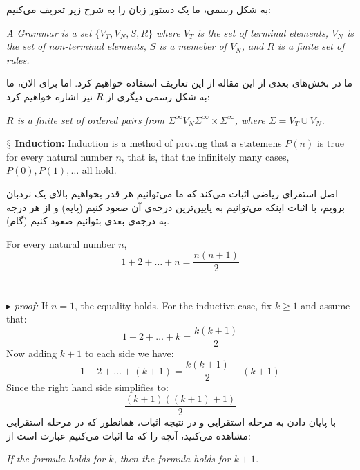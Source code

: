 \documentclass[10pt,a4paper]{article}
\newcounter{theo}
\newcommand{\newpoint}[1]{\indent$\mathsection$ \textbf{#1}}
\newcommand{\proof}{\\ \ \\ $\blacktriangleright$ \textit{proof: }}
\begin{document}
                    به شکل رسمی، ما یک دستور زبان را به شرح زیر تعریف می‌کنیم:
                    \begin{define}
                        \textit{A Grammar is a set $\{V_T,V_N,S, R\}$ where $V_T$ is the set of terminal elements, $V_N$ is the set of non-terminal elements, $S$ is a memeber of $V_N$, and $R$ is a finite set of rules.}
                    \end{define}
ما در بخش‌های بعدی از این مقاله از این تعاریف استفاده خواهیم کرد. اما برای الان، ما به شکل رسمی دیگری از $R$ نیز اشاره خواهیم کرد:\cite{Leary2019-ip}
                    \begin{define}
                        \textit{$R$ is a finite set of ordered pairs from $\Sigma^\infty V_N \Sigma^\infty\times \Sigma^\infty$, where $\Sigma = V_T\cup V_N$.}
                    \end{define}
                    \newpoint{Induction:} Induction is a method of proving that a statemens $P(n)$ is true for every natural number $n$, that is, that the infinitely many cases, $P(0), P(1),\dots$ all hold. \cite{enwiki:1157726892}
                    \begin{qt}
                        اصل استقرای ریاضی اثبات می‌کند که ما می‌توانیم هر قدر بخواهیم بالای یک نردبان برویم، با اثبات اینکه می‌توانیم به پایین‌ترین درجه‌ی آن صعود کنیم (پایه) و از هر درجه به درجه‌ی بعدی بتوانیم صعود کنیم (گام).
                    \end{qt}
                    \begin{theorem}
                        For every natural number $n$,
                        \begin{equation}
                            1+2+\dots + n = \frac{n(n+1)}{2}
                        \end{equation}
                    \
                    \proof If $n=1$, the equality holds. For the inductive case, fix $k\geq 1$ and assume that:
                    \begin{equation}
                        1+2+\dots+k =\frac{k(k+1)}{2}
                    \end{equation}
                    Now adding $k+1$ to each side we have:
                    \begin{equation}
                        1+2+\dots+(k+1) = \frac{k(k+1)}{2}+(k+1)
                    \end{equation}
                    Since the right hand side simplifies to:
                    \begin{equation}
                        \frac{(k+1)((k+1) + 1)}{2}
                    \end{equation}
                    با پایان دادن به مرحله استقرایی و در نتیجه اثبات، همانطور که در مرحله استقرایی مشاهده می‌کنید، آنچه را که ما اثبات می‌کنیم عبارت است از:
                    \begin{qt}
                        \textit{If the formula holds for $k$, then the formula holds for $k+1$.}
                    \end{qt}
                    \end{theorem}
\end{document}
